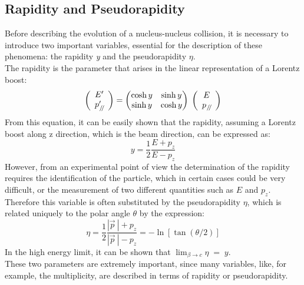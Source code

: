 \subsection{Rapidity and Pseudorapidity}
Before describing the evolution of a nucleus-nucleus collision, it is necessary to introduce two important variables, essential for the description of these phenomena: the rapidity \textit{y} and the pseudorapidity $\eta$.\\
The rapidity is the parameter that arises in the linear representation of a Lorentz boost:
\begin{equation}
 \left(
    \begin{array}{c}
      E'\\
      p'_{\:\mathbin{\!/\mkern-4mu/\!}}
    \end{array}
  \right) = 
      \begin{pmatrix}
      \cosh y & \sinh y \\
      \sinh y & \cosh y 
    \end{pmatrix}
  \;
  \left(
     \begin{array}{c}
      E\\
      p_{\:\mathbin{\!/\mkern-4mu/\!}}
    \end{array}
  \right)
\end{equation}
%
From this equation, it can be easily shown that the rapidity, assuming a Lorentz boost along z direction, which is the beam direction, can be expressed as:
\begin{equation}
 y = \frac{1}{2}\frac{E + p_{z}}{E - p_{z}}
\end{equation}
However, from an experimental point of view the determination of the rapidity requires the identification of the particle, which in certain cases could be very difficult, or the measurement of two different quantities such as $E$ and $p_{z}$. Therefore this variable is often substituted by the pseudorapidity $\eta$, which is related uniquely to the polar angle $\theta$ by the expression:
\begin{equation}
 \eta = \frac{1}{2}\frac{|\vec{p}\:| + p_{z}}{|\vec{p}\:| - p_{z}} = - \ln [\tan (\theta/2)]
\end{equation}
In the high energy limit, it can be shown that $\lim_{\beta \to c} \eta \;= \;y$.\\
These two parameters are extremely important, since many variables, like, for example, the multiplicity, are described in terms of rapidity or pseudorapidity.\\



